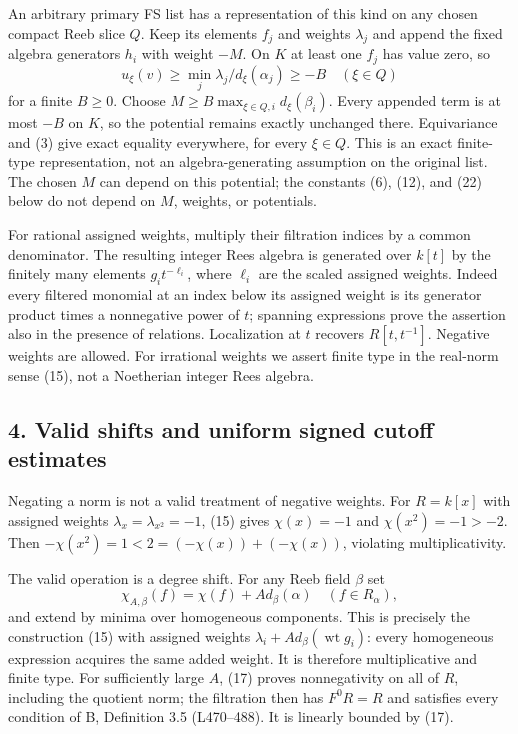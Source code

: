 \documentclass[
  11pt,
]{article}
\begin{document}
An arbitrary primary FS list has a representation of this kind on any
chosen compact Reeb slice \(Q\). Keep its elements \(f_j\) and weights
\(\lambda_j\) and append the fixed algebra generators \(h_i\) with
weight \(-M\). On \(K\) at least one \(f_j\) has value zero, so \[
 u_\xi(v)\geq\min_j\lambda_j/d_\xi(\alpha_j)\geq-B
 \quad(\xi\in Q)
\] for a finite \(B\geq0\). Choose
\(M\geq B\max_{\xi\in Q,i}d_\xi(\beta_i)\). Every appended term is at
most \(-B\) on \(K\), so the potential remains exactly unchanged there.
Equivariance and (3) give exact equality everywhere, for every
\(\xi\in Q\). This is an exact finite-type representation, not an
algebra-generating assumption on the original list. The chosen \(M\) can
depend on this potential; the constants (6), (12), and (22) below do not
depend on \(M\), weights, or potentials.

For rational assigned weights, multiply their filtration indices by a
common denominator. The resulting integer Rees algebra is generated over
\(k[t]\) by the finitely many elements \(g_i t^{-\ell_i}\), where
\(\ell_i\) are the scaled assigned weights. Indeed every filtered
monomial at an index below its assigned weight is its generator product
times a nonnegative power of \(t\); spanning expressions prove the
assertion also in the presence of relations. Localization at \(t\)
recovers \(R[t,t^{-1}]\). Negative weights are allowed. For irrational
weights we assert finite type in the real-norm sense (15), not a
Noetherian integer Rees algebra.

\subsection{4. Valid shifts and uniform signed cutoff
estimates}\label{valid-shifts-and-uniform-signed-cutoff-estimates}

Negating a norm is not a valid treatment of negative weights. For
\(R=k[x]\) with assigned weights \(\lambda_x=\lambda_{x^2}=-1\), (15)
gives \(\chi(x)=-1\) and \(\chi(x^2)=-1>-2\). Then
\(-\chi(x^2)=1<2=(-\chi(x))+(-\chi(x))\), violating multiplicativity.

The valid operation is a degree shift. For any Reeb field \(\beta\) set
\[
 \chi_{A,\beta}(f)=\chi(f)+A d_\beta(\alpha)
 \quad(f\in R_\alpha),                              \tag{19}
\] and extend by minima over homogeneous components. This is precisely
the construction (15) with assigned weights
\(\lambda_i+A d_\beta(\operatorname{wt}g_i)\): every homogeneous
expression acquires the same added weight. It is therefore
multiplicative and finite type. For sufficiently large \(A\), (17)
proves nonnegativity on all of \(R\), including the quotient norm; the
filtration then has \(F^0R=R\) and satisfies every condition of B,
Definition 3.5 (L470--488). It is linearly bounded by (17).
\end{document}
